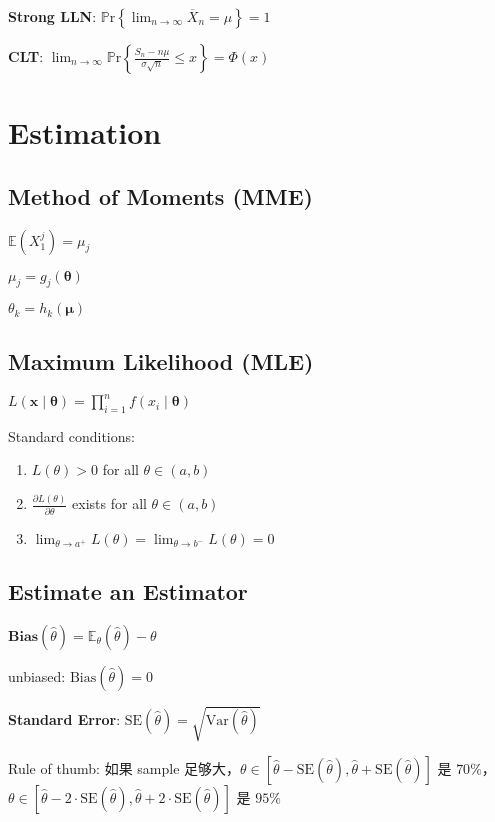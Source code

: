 \documentclass[9pt,landscape]{article}
\begin{document}
\begin{multicols}{3}
\textbf{Strong LLN}: $\mathbb{P}\mathrm{r}\left\{\lim_{n\to\infty}\overline{X}_n=\mu\right\}=1$

\textbf{CLT}: $\lim_{n\to\infty}\mathbb{P}\mathrm{r}\left\{\frac{S_n-n\mu}{\sigma\sqrt{n}}\le x\right\}=\Phi(x)$

\section{Estimation}

\subsection{Method of Moments (MME)}

$\mathbb{E}(X_1^j)=\mu_j$

$\mu_j=g_j(\boldsymbol{\theta})$

$\theta_k=h_k(\boldsymbol{\mu})$

\subsection{Maximum Likelihood (MLE)}

$L(\boldsymbol{x}\mid \boldsymbol{\theta})=\prod_{i=1}^n f(x_i\mid \boldsymbol{\theta})$

Standard conditions:
\begin{enumerate}
	\item $L(\theta)>0$ for all $\theta\in(a, b)$
	\item $\frac{\partial L(\theta)}{\partial\theta}$ exists for all $\theta\in (a, b)$
	\item $\lim_{\theta\to a^+}L(\theta)=\lim_{\theta\to b^-}L(\theta)=0$
\end{enumerate}

\subsection{Estimate an Estimator}

$\mathbf{Bias}(\hat\theta)=\mathbb{E}_\theta(\hat\theta)-\theta$

unbiased: $\mathrm{Bias}(\hat\theta)=0$

\textbf{Standard Error}: $\mathrm{SE}(\hat\theta)=\sqrt{\mathrm{Var}(\hat{\theta})}$

Rule of thumb: 如果 sample 足够大，$\theta\in[\hat{\theta}-\mathrm{SE}(\hat{\theta}),\hat{\theta}+\mathrm{SE}(\hat{\theta})]$ 是 $70\%$，$\theta\in[\hat{\theta}-2\cdot\mathrm{SE}(\hat{\theta}),\hat{\theta}+2\cdot\mathrm{SE}(\hat{\theta})]$ 是 $95\%$


\end{multicols}
\end{document}
